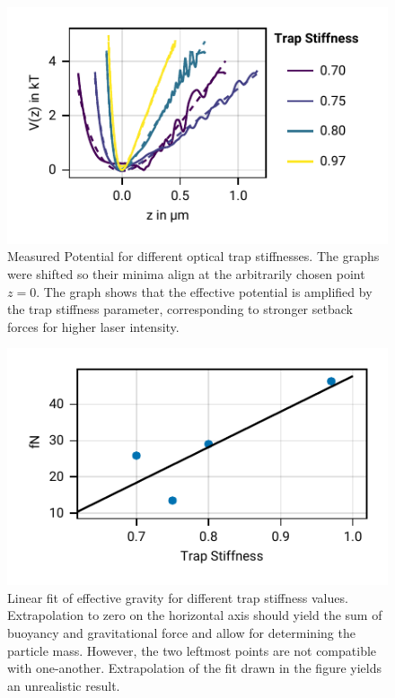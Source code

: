 \documentclass[
    twoside=false,
    twocolumn=true,
    fontsize=11pt,
]{scrarticle}
\begin{document}
\begin{figure}
    \centering
    \includegraphics{figures/02_05_01_potential.pdf}
    \caption{Measured Potential for different optical trap stiffnesses. The graphs were shifted so their minima align at the arbitrarily chosen point $z=0$. The graph shows that the effective potential is amplified by the trap stiffness parameter, corresponding to stronger setback forces for higher laser intensity.}
    \label{fig:pot_various_ts}
\end{figure}
\begin{figure}
    \centering
    \includegraphics{figures/02_05_02_gravity.pdf}
    \caption{Linear fit of effective gravity for different trap stiffness values. Extrapolation to zero on the horizontal axis should yield the sum of buoyancy and gravitational force and allow for determining the particle mass. However, the two leftmost points are not compatible with one-another. Extrapolation of the fit drawn in the figure yields an unrealistic result.}
    \label{fig:fg_lin}
\end{figure}
\end{document}
